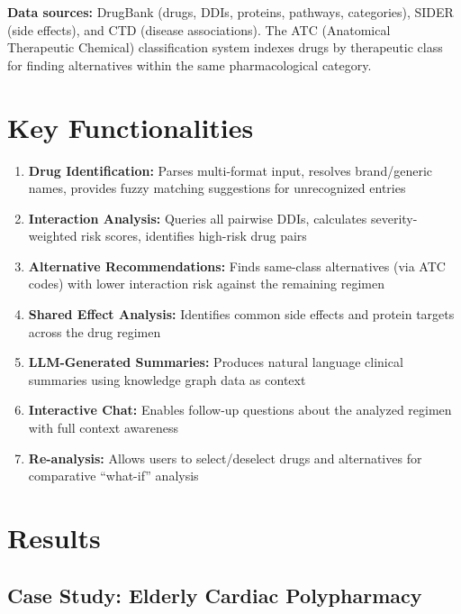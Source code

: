 \documentclass[11pt,a4paper]{article}
\begin{document}
\textbf{Data sources:} DrugBank (drugs, DDIs, proteins, pathways, categories), SIDER (side effects), and CTD (disease associations). The ATC (Anatomical Therapeutic Chemical) classification system indexes drugs by therapeutic class for finding alternatives within the same pharmacological category.

\section{Key Functionalities}

\begin{enumerate}
\item \textbf{Drug Identification:} Parses multi-format input, resolves brand/generic names, provides fuzzy matching suggestions for unrecognized entries
\item \textbf{Interaction Analysis:} Queries all pairwise DDIs, calculates severity-weighted risk scores, identifies high-risk drug pairs
\item \textbf{Alternative Recommendations:} Finds same-class alternatives (via ATC codes) with lower interaction risk against the remaining regimen
\item \textbf{Shared Effect Analysis:} Identifies common side effects and protein targets across the drug regimen
\item \textbf{LLM-Generated Summaries:} Produces natural language clinical summaries using knowledge graph data as context
\item \textbf{Interactive Chat:} Enables follow-up questions about the analyzed regimen with full context awareness
\item \textbf{Re-analysis:} Allows users to select/deselect drugs and alternatives for comparative ``what-if'' analysis
\end{enumerate}

\section{Results}

\subsection{Case Study: Elderly Cardiac Polypharmacy}
\end{document}

